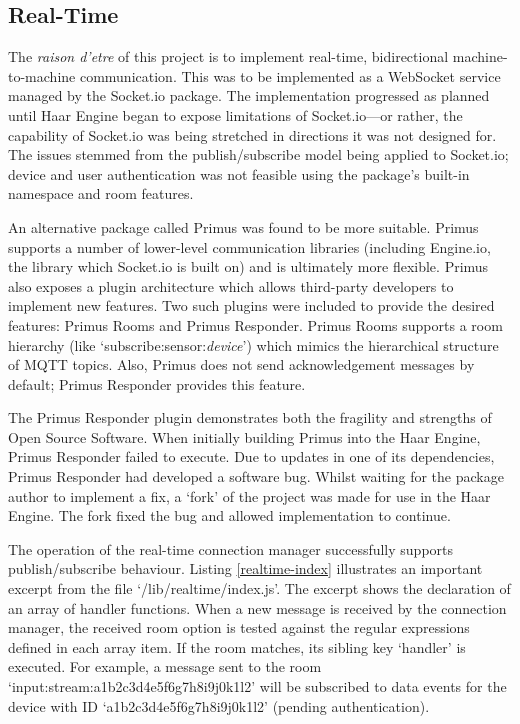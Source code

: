     \subsection{Real-Time}
      The \textit{raison d'etre} of this project is to implement real-time, bidirectional machine-to-machine communication. This was to be implemented as a WebSocket service managed by the Socket.io package. The implementation progressed as planned until Haar Engine began to expose limitations of Socket.io---or rather, the capability of Socket.io was being stretched in directions it was not designed for. The issues stemmed from the publish/subscribe model being applied to Socket.io; device and user authentication was not feasible using the package's built-in namespace and room features.

      An alternative package called Primus was found to be more suitable. Primus supports a number of lower-level communication libraries (including Engine.io, the library which Socket.io is built on) and is ultimately more flexible. Primus also exposes a plugin architecture which allows third-party developers to implement new features. Two such plugins were included to provide the desired features: Primus Rooms and Primus Responder. Primus Rooms supports a room hierarchy (like `subscribe:sensor:\textit{device}') which mimics the hierarchical structure of MQTT topics. Also, Primus does not send acknowledgement messages by default; Primus Responder provides this feature.

      The Primus Responder plugin demonstrates both the fragility and strengths of Open Source Software. When initially building Primus into the Haar Engine, Primus Responder failed to execute. Due to updates in one of its dependencies, Primus Responder had developed a software bug. Whilst waiting for the package author to implement a fix, a `fork' of the project was made for use in the Haar Engine. The fork fixed the bug and allowed implementation to continue.

      The operation of the real-time connection manager successfully supports publish/subscribe behaviour. Listing \ref{realtime-index} illustrates an important excerpt from the file `/lib/realtime/index.js'. The excerpt shows the declaration of an array of handler functions. When a new message is received by the connection manager, the received room option is tested against the regular expressions defined in each array item. If the room matches, its sibling key `handler' is executed. For example, a message sent to the room `input:stream:a1b2c3d4e5f6g7h8i9j0k1l2' will be subscribed to data events for the device with ID `a1b2c3d4e5f6g7h8i9j0k1l2' (pending authentication).

